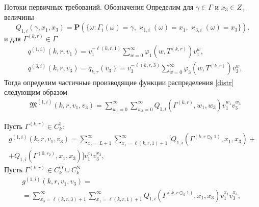 \documentclass[10pt]{beamer}
\begin{document}
\begin{frame}[allowframebreaks]{Потоки первичных требований. Обозначения}
Определим для  $\gamma \in \Gamma$ и $x_3 \in Z_+$ величины
\begin{equation}
Q_{1,i}(\gamma,x_1,x_3) = {\mathbf P}(\{\omega\colon \Gamma_{i}(\omega)=\gamma, \varkappa_{1,i}(\omega)=x_1, \varkappa_{3,i}(\omega)=x_3\}).
\label{distr}
\end{equation}
и для $\Gamma^{(k,r)}\in \Gamma$
\begin{align}
    &q^{(1,i)}(k,r, v_1) = v_1^{-\ell(k,r,1)}\sum_{w=0}^{\infty} \varphi_1(w,T^{(k,r)})v_1^w,\\
&q^{(3,i)}(k,r, v_3) = q_{k,r} (v_3) = v_3^{-\ell(k,r,3)}\sum_{w=0}^{\infty} \varphi_3(w,T^{(k,r)})v_3^w,
\end{align}
Тогда определим частичные производящие функции распределения \eqref{distr} следующим образом
\begin{align}
&\mathfrak{M}^{(1,i)}(k,r,v_1,v_3) = \sum_{w_1=0}^{\infty}\sum_{w_3=0}^{\infty} Q_{1,i}(\Gamma^{(k,r)},w_1,w_3) v_1^{w_1} v_3^{w_3}
\end{align}

\framebreak
Пусть $\Gamma^{(k,r)} \in C_{k}^{\mathrm{I}}$:
\begin{multline}
    g^{(1,i)}(k,r,v_1,v_3) =\sum_{x_3=L+1}^{\infty} \sum_{x_1=\ell(k,r,1)+1}^{\infty}  [  Q_{1,i}(\Gamma^{(k, r\ominus_{k}1)},x_1, x_3) +\\+Q_{1,i}(\Gamma^{(0, r_2)},x_1, x_3)]v_1^{x_1} v_3^{ x_3}, \quad 
\end{multline}
Пусть $\Gamma^{(k,r)} \in C_{k}^{\mathrm{O}} \cup C_{k}^{\mathrm{N}}$
\begin{multline}
g^{(1,i)}(k,r,v_1,v_3) =\\
    =\!\!\sum_{x_3=\ell(k,r,3)+1}^{\infty} \sum_{x_1=\ell(k,r,1)+1}^{\infty}
    \!\! Q_{1,i}(\Gamma^{(k, r\ominus_{k}1)}\!,x_1, x_3) v_1^{x_1} v_3^{ x_3}, \; 
\end{multline}

\end{frame}
\end{document}
